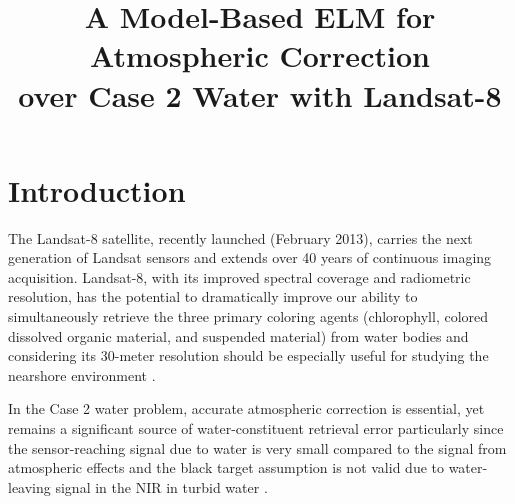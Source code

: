 \documentclass{article}
\title{A Model-Based ELM for Atmospheric Correction\\ over Case 2 Water with Landsat-8}
\begin{document}
\onecolumn
%
\maketitle
%
\section{Introduction}
\label{sec:intro}

The Landsat-8 satellite, recently launched (February 2013), carries the next generation of Landsat sensors and extends over 40 years of continuous imaging acquisition. Landsat-8, with its improved spectral coverage and radiometric resolution, has the potential to dramatically improve our ability to simultaneously retrieve the three primary coloring agents (chlorophyll, colored dissolved organic material, and suspended material) from water bodies and considering its 30-meter resolution should be especially useful for studying the nearshore environment \cite{Gerace:2012}.

In the Case 2 water problem, accurate atmospheric correction is essential, yet remains a significant source of water-constituent retrieval error particularly since the sensor-reaching signal due to water is very small compared to the signal from atmospheric effects and the black target assumption is not valid due to water-leaving signal in the NIR in turbid water \cite{Siegel:2000fv}.
\end{document}
